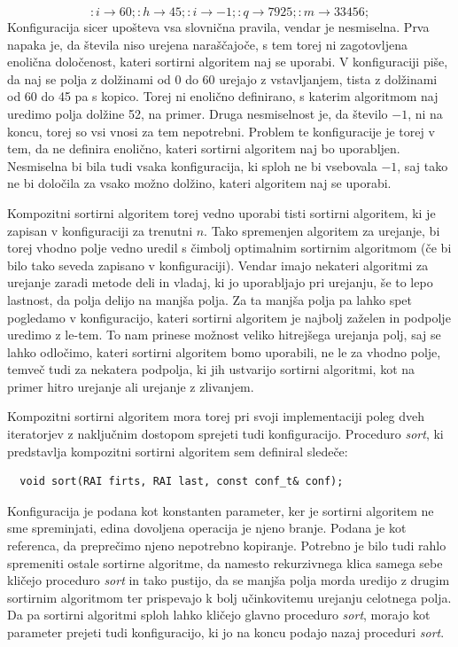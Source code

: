 \documentclass[a4paper,oneside,10pt]{article}
\newcommand{\lra}{\ensuremath{\longrightarrow}}
\begin{document}
\[ :i \lra 60;:h \lra 45;:i \lra -1;:q \lra 7925;:m \lra 33456; \]
Konfiguracija sicer upošteva vsa slovnična pravila, vendar je nesmiselna. Prva napaka je,
da števila niso urejena naraščajoče, s tem torej ni zagotovljena enolična določenost,
kateri sortirni algoritem naj se uporabi. V konfiguraciji piše, da naj se polja z
dolžinami od 0 do 60 urejajo z vstavljanjem, tista z dolžinami od 60 do 45 pa s kopico.
Torej ni enolično definirano, s katerim algoritmom naj uredimo polja dolžine 52, na primer. 
Druga nesmiselnost je, da število $-1$, ni na koncu, torej so
vsi vnosi za tem nepotrebni. Problem te konfiguracije je torej v tem, da ne definira
enolično, kateri sortirni algoritem naj bo uporabljen. Nesmiselna bi bila tudi vsaka
konfiguracija, ki sploh ne bi vsebovala $-1$, saj tako ne bi določila za vsako možno
dolžino, kateri algoritem naj se uporabi.

Kompozitni sortirni algoritem torej vedno uporabi tisti sortirni algoritem, ki je zapisan
v konfiguraciji za trenutni $n$. Tako spremenjen algoritem za urejanje, bi torej vhodno
polje vedno uredil s čimbolj optimalnim sortirnim algoritmom (če bi bilo tako seveda
zapisano v konfiguraciji). Vendar imajo nekateri algoritmi za urejanje zaradi metode deli in vladaj,
ki jo uporabljajo pri urejanju, še to lepo lastnost, da polja delijo na manjša polja. Za
ta manjša polja pa lahko spet pogledamo v konfiguracijo, kateri sortirni algoritem je
najbolj zaželen in podpolje uredimo z le-tem. To nam prinese možnost veliko hitrejšega
urejanja polj, saj se lahko odločimo, kateri sortirni algoritem bomo
uporabili, ne le za vhodno polje, temveč tudi za nekatera podpolja, ki jih ustvarijo
sortirni algoritmi, kot na primer hitro urejanje ali urejanje z zlivanjem.

Kompozitni sortirni algoritem mora torej pri svoji implementaciji poleg dveh 
iteratorjev z naključnim dostopom sprejeti tudi konfiguracijo. Proceduro \emph{sort},
ki predstavlja kompozitni sortirni algoritem sem definiral sledeče: 

\begin{lstlisting}
  void sort(RAI firts, RAI last, const conf_t& conf);
\end{lstlisting}

Konfiguracija je podana kot konstanten parameter, ker je sortirni algoritem ne sme
spreminjati, edina dovoljena operacija je njeno branje. Podana je kot referenca, da
preprečimo njeno nepotrebno kopiranje.
Potrebno je bilo tudi rahlo spremeniti ostale sortirne algoritme, da namesto rekurzivnega
klica samega sebe kličejo proceduro \emph{sort} in tako pustijo, da se manjša polja morda uredijo z
drugim sortirnim algoritmom ter prispevajo k bolj učinkovitemu urejanju celotnega polja. Da pa
sortirni algoritmi sploh lahko kličejo glavno proceduro \emph{sort}, morajo kot
parameter prejeti tudi konfiguracijo, ki jo na koncu podajo nazaj proceduri \emph{sort}.
\end{document}
